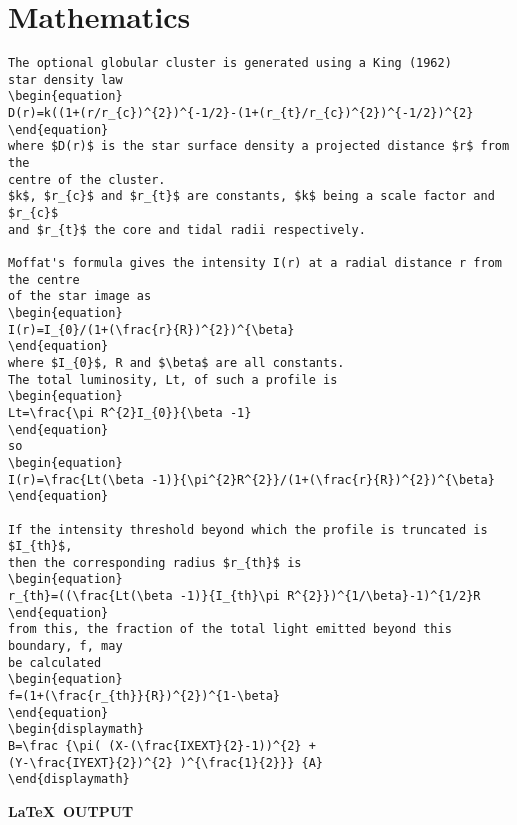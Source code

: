 \newpage

\section{Mathematics}

\begin{verbatim}
The optional globular cluster is generated using a King (1962)
star density law
\begin{equation}
D(r)=k((1+(r/r_{c})^{2})^{-1/2}-(1+(r_{t}/r_{c})^{2})^{-1/2})^{2}
\end{equation}
where $D(r)$ is the star surface density a projected distance $r$ from the
centre of the cluster.
$k$, $r_{c}$ and $r_{t}$ are constants, $k$ being a scale factor and $r_{c}$
and $r_{t}$ the core and tidal radii respectively.

Moffat's formula gives the intensity I(r) at a radial distance r from the centre
of the star image as
\begin{equation}
I(r)=I_{0}/(1+(\frac{r}{R})^{2})^{\beta}
\end{equation}
where $I_{0}$, R and $\beta$ are all constants.
The total luminosity, Lt, of such a profile is
\begin{equation}
Lt=\frac{\pi R^{2}I_{0}}{\beta -1}
\end{equation}
so
\begin{equation}
I(r)=\frac{Lt(\beta -1)}{\pi^{2}R^{2}}/(1+(\frac{r}{R})^{2})^{\beta}
\end{equation}

If the intensity threshold beyond which the profile is truncated is $I_{th}$,
then the corresponding radius $r_{th}$ is
\begin{equation}
r_{th}=((\frac{Lt(\beta -1)}{I_{th}\pi R^{2}})^{1/\beta}-1)^{1/2}R
\end{equation}
from this, the fraction of the total light emitted beyond this boundary, f, may
be calculated
\begin{equation}
f=(1+(\frac{r_{th}}{R})^{2})^{1-\beta}
\end{equation}
\begin{displaymath}
B=\frac {\pi( (X-(\frac{IXEXT}{2}-1))^{2} + 
(Y-\frac{IYEXT}{2})^{2} )^{\frac{1}{2}}} {A}
\end{displaymath}
\end{verbatim}

\newpage

\begin{center}
{\bf \LaTeX\ OUTPUT}
\end{center}

